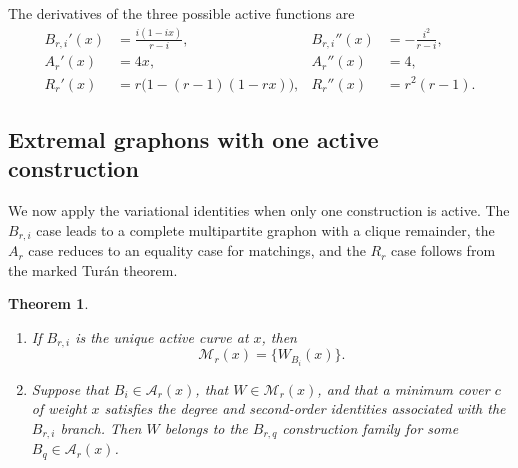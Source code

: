 \documentclass[10pt]{article}
\numberwithin{equation}{section}
\newtheorem{theorem}{Theorem}[section]
\newcommand{\cA}{\mathcal A}
\newcommand{\cM}{\mathcal M}
\begin{document}
The derivatives of the three possible active functions are
\begin{align}
 B_{r,i}'(x)&=\frac{i(1-ix)}{r-i},
 &B_{r,i}''(x)&=-\frac{i^2}{r-i},\label{eq:Bderivatives}\\
 A_r'(x)&=4x,
 &A_r''(x)&=4,\label{eq:Aderivatives}\\
 R_r'(x)&=r\bigl(1-(r-1)(1-rx)\bigr),
 &R_r''(x)&=r^2(r-1).\label{eq:Rderivatives}
\end{align}

\subsection{Extremal graphons with one active construction}\label{sec:single-active}

We now apply the variational identities when only one construction is active.  The $B_{r,i}$ case leads to a complete multipartite graphon with a clique remainder, the $A_r$ case reduces to an equality case for matchings, and the $R_r$ case follows from the marked Tur\'an theorem.

\label{sec:Bphase}
\begin{theorem}\label{thm:B-classification}
\begin{enumerate}[label=\textup{(\roman*)}]
\item If $B_{r,i}$ is the unique active curve at $x$, then
\[
 \cM_r(x)=\{W_{B_i}(x)\}.
\]
\item Suppose that $B_i\in\cA_r(x)$, that $W\in\cM_r(x)$, and that a minimum cover $c$ of weight $x$ satisfies the degree and second-order identities associated with the $B_{r,i}$ branch.  Then $W$ belongs to the $B_{r,q}$ construction family for some $B_q\in\cA_r(x)$.
\end{enumerate}
\end{theorem}
\end{document}
